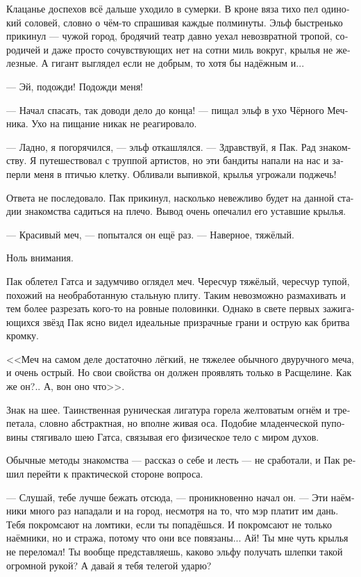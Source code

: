 \documentclass[a4paper,12pt,fleqn]{book}\usepackage{polyglossia}\setdefaultlanguage[babelshorthands=true]{russian}\setotherlanguage{english}\defaultfontfeatures{Ligatures=TeX,Mapping=tex-text}\usepackage{xcolor}\newcommand{\ml}[3]{#2}
\newcommand{\asterism}{\vspace{1em}{\centering\Large\bfseries$\ast~\ast~\ast$\par}\vspace{1em}}
\begin{document}
Клацанье доспехов всё дальше уходило в сумерки.
В кроне вяза тихо пел одинокий соловей, словно о чём-то спрашивая каждые полминуты.
Эльф быстренько прикинул --- чужой город, бродячий театр давно уехал невозвратной тропой, сородичей и даже просто сочувствующих нет на сотни миль вокруг, крылья не железные.
А гигант выглядел если не добрым, то хотя бы надёжным и...

--- Эй, подожди!
Подожди меня!

\asterism

--- Начал спасать, так доводи дело до конца! --- пищал эльф в ухо Чёрного Мечника.
Ухо на пищание никак не реагировало.

--- Ладно, я погорячился, --- эльф откашлялся.
--- Здравствуй, я Пак.
Рад знакомству.
Я путешествовал с труппой артистов, но эти бандиты напали на нас и заперли меня в птичью клетку.
Обливали выпивкой, крылья угрожали поджечь!

Ответа не последовало.
Пак прикинул, насколько невежливо будет на данной стадии знакомства садиться на плечо.
Вывод очень опечалил его уставшие крылья.

--- Красивый меч, --- попытался он ещё раз.
--- Наверное, тяжёлый.

Ноль внимания.

Пак облетел Гатса и задумчиво оглядел меч.
Чересчур тяжёлый, чересчур тупой, похожий на необработанную стальную плиту.
Таким невозможно размахивать и тем более разрезать кого-то на ровные половинки.
Однако в свете первых зажигающихся звёзд Пак ясно видел идеальные призрачные грани и острую как бритва кромку.

<<Меч на самом деле достаточно лёгкий, не тяжелее обычного двуручного меча, и очень острый.
Но свои свойства он должен проявлять только в Расщелине.
Как же он?..
А, вон оно что>>.

Знак на шее.
Таинственная руническая лигатура горела желтоватым огнём и трепетала, словно абстрактная, но вполне живая оса.
Подобие младенческой пуповины стягивало шею Гатса, связывая его физическое тело с миром духов.

Обычные методы знакомства --- рассказ о себе и лесть --- не сработали, и Пак решил перейти к практической стороне вопроса.

--- Слушай, тебе лучше бежать отсюда, --- проникновенно начал он.
--- Эти наёмники много раз нападали и на город, несмотря на то, что мэр платит им дань.
Тебя покромсают на ломтики, если ты попадёшься.
И покромсают не только наёмники, но и стража, потому что они все повязаны...
Ай!
Ты мне чуть крылья не переломал!
Ты вообще представляешь, каково эльфу получать шлепки такой огромной рукой?
А давай я тебя телегой ударю?
\end{document}
